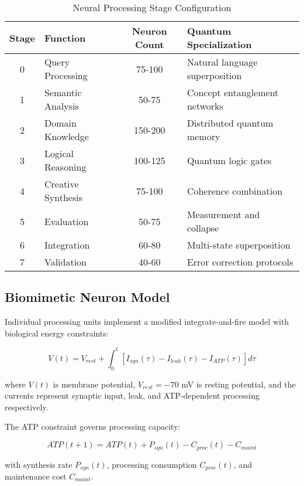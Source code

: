 \documentclass[12pt,a4paper]{article}
\begin{document}
\begin{table}[H]
\centering
\caption{Neural Processing Stage Configuration}
\label{tab:processing_stages}
\begin{tabular}{clcl}
\toprule
\textbf{Stage} & \textbf{Function} & \textbf{Neuron Count} & \textbf{Quantum Specialization} \\
\midrule
0 & Query Processing & 75-100 & Natural language superposition \\
1 & Semantic Analysis & 50-75 & Concept entanglement networks \\
2 & Domain Knowledge & 150-200 & Distributed quantum memory \\
3 & Logical Reasoning & 100-125 & Quantum logic gates \\
4 & Creative Synthesis & 75-100 & Coherence combination \\
5 & Evaluation & 50-75 & Measurement and collapse \\
6 & Integration & 60-80 & Multi-state superposition \\
7 & Validation & 40-60 & Error correction protocols \\
\bottomrule
\end{tabular}
\end{table}

\subsection{Biomimetic Neuron Model}

Individual processing units implement a modified integrate-and-fire model with biological energy constraints:

\begin{equation}
V(t) = V_{rest} + \int_0^t [I_{syn}(\tau) - I_{leak}(\tau) - I_{ATP}(\tau)]d\tau
\label{eq:neuron_model}
\end{equation}

where $V(t)$ is membrane potential, $V_{rest} = -70$ mV is resting potential, and the currents represent synaptic input, leak, and ATP-dependent processing respectively.

The ATP constraint governs processing capacity:

\begin{equation}
ATP(t+1) = ATP(t) + P_{syn}(t) - C_{proc}(t) - C_{maint}
\label{eq:atp_constraint}
\end{equation}

with synthesis rate $P_{syn}(t)$, processing consumption $C_{proc}(t)$, and maintenance cost $C_{maint}$.
\end{document}
